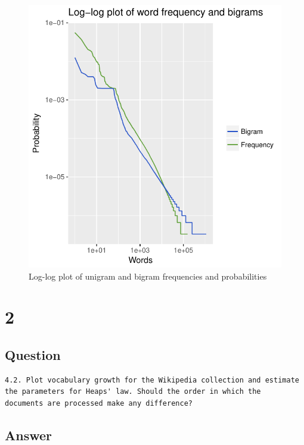 \documentclass[letterpaper,11pt]{article}
\begin{document}
   \begin{figure}[h]
  \centering
  \includegraphics[scale=0.9]{unigram_and_bigram.pdf}
  \caption{Log-log plot of unigram and bigram frequencies and probabilities}
  \label{fig:q1p3}
  \end{figure}


\clearpage


\section*{2}

\subsection*{Question}

\begin{verbatim}
4.2. Plot vocabulary growth for the Wikipedia collection and estimate 
the parameters for Heaps' law. Should the order in which the 
documents are processed make any difference?
\end{verbatim}

\subsection*{Answer}
\end{document}
